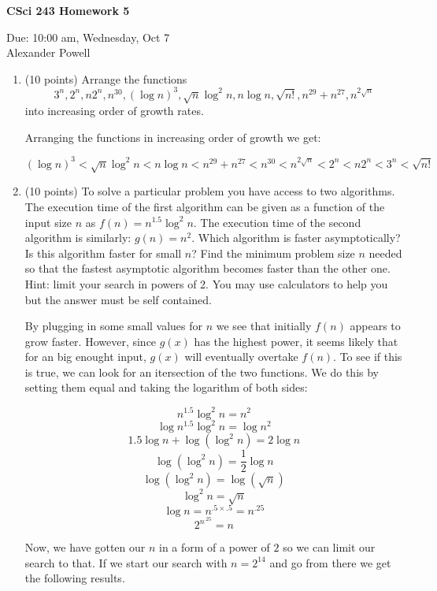 \documentclass[11pt]{article}
\begin{document}
\begin{center}             %
\begin{LARGE}
{\bf CSci 243 Homework 5}
\end{LARGE}
\vskip 0.25cm      %

Due: 10:00 am, Wednesday, Oct 7 \\  %
Alexander Powell
\end{center}

\begin{enumerate}

\item (10 points) Arrange the functions 
$$3^n, 2^n, n 2^n,  n^{30}, (\log n)^3, \sqrt{n}\log^2 n, n\log n, \sqrt{n!}, n^{29}+n^{27}, n^{2\sqrt{n}}$$
into increasing order of growth rates.

Arranging the functions in increasing order of growth we get:

$$ (\log n)^3 < \sqrt{n}\log^2 n < n\log n < n^{29}+n^{27} < n^{30} < n^{2\sqrt{n}} < 2^n < n 2^n < 3^n < \sqrt{n!} $$

\item (10 points) 
To solve a particular problem you have access to two algorithms. 
The execution time of the first algorithm can be given as a function of the
input size $n$ as $f(n) = n^{1.5} \log^2 n$.
The execution time of the second algorithm is similarly: $g(n) = n^2$.
Which algorithm is faster asymptotically?
Is this algorithm faster for small $n$?
Find the minimum problem size $n$ needed so that the fastest asymptotic 
algorithm becomes faster than the other one.
Hint: limit your search in powers of 2. You may use calculators to help you
but the answer must be self contained.

By plugging in some small values for $n$ we see that initially $f(n)$ appears to grow faster.  However, since $g(x)$ has the highest power, it seems likely that for an big enought input, $g(x)$ will eventually overtake $f(n)$.  To see if this is true, we can look for an itersection of the two functions.  We do this by setting them equal and taking the logarithm of both sides:

$$ n^{1.5}\log^2 n = n^2 $$
$$ \log{n^{1.5}\log^2 n} = \log{n^2} $$
$$ 1.5 \log n + \log{(\log^2 n)} = 2 \log n $$
$$ \log{(\log^2 n)} = \frac{1}{2} \log n $$
$$ \log{(\log^2 n)} = \log{(\sqrt{n})} $$
$$ \log^2 n = \sqrt{n} $$
$$ \log n = n^{.5 \times .5} = n^{.25} $$
$$ 2^{n^{.25}} = n $$

Now, we have gotten our $n$ in a form of a power of $2$ so we can limit our search to that.  If we start our search with $n=2^{14}$ and go from there we get the following results.  


\end{enumerate}
\end{document}
